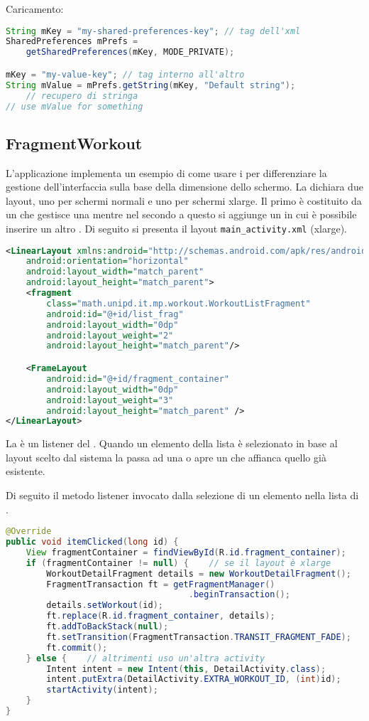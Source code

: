 Caricamento:
\begin{lstlisting}[language=Java]
String mKey = "my-shared-preferences-key"; // tag dell'xml
SharedPreferences mPrefs = 
	getSharedPreferences(mKey, MODE_PRIVATE);

mKey = "my-value-key"; // tag interno all'altro
String mValue = mPrefs.getString(mKey, "Default string"); 
	// recupero di stringa
// use mValue for something
\end{lstlisting}


\subsection{FragmentWorkout}
L'applicazione implementa un esempio di come usare i \Fragment per differenziare la gestione dell'interfaccia sulla base della dimensione dello schermo.
La \MainActivity dichiara due layout, uno per schermi normali e uno per schermi xlarge. Il primo è costituito da un \ListFragment che gestisce una \ListView mentre nel secondo a questo si aggiunge un \FrameLayout in cui è possibile inserire un altro \Fragment. Di seguito si presenta il layout \texttt{main\_activity.xml} (xlarge).

\begin{lstlisting}[language=XML]
<LinearLayout xmlns:android="http://schemas.android.com/apk/res/android"
    android:orientation="horizontal"
    android:layout_width="match_parent"
    android:layout_height="match_parent">
    <fragment
        class="math.unipd.it.mp.workout.WorkoutListFragment"
        android:id="@+id/list_frag"
        android:layout_width="0dp"
        android:layout_weight="2"
        android:layout_height="match_parent"/>

    <FrameLayout
        android:id="@+id/fragment_container"
        android:layout_width="0dp"
        android:layout_weight="3"
        android:layout_height="match_parent" />
</LinearLayout>
\end{lstlisting}

La \MainActivity è un listener del \Fragment \WorkoutListFragment. Quando un elemento della lista è selezionato in base al layout scelto dal sistema la \MainActivity passa ad una \Activity o apre un \Fragment che affianca quello già esistente.

Di seguito il metodo listener invocato dalla selezione di un elemento nella lista di \WorkoutListFragment.

\begin{lstlisting}[language=Java]
@Override
public void itemClicked(long id) {
	View fragmentContainer = findViewById(R.id.fragment_container);
	if (fragmentContainer != null) {	// se il layout è xlarge
		WorkoutDetailFragment details = new WorkoutDetailFragment();
		FragmentTransaction ft = getFragmentManager()
									.beginTransaction();
		details.setWorkout(id);
		ft.replace(R.id.fragment_container, details);
		ft.addToBackStack(null);
		ft.setTransition(FragmentTransaction.TRANSIT_FRAGMENT_FADE);
		ft.commit();
	} else {	// altrimenti uso un'altra activity
		Intent intent = new Intent(this, DetailActivity.class);
		intent.putExtra(DetailActivity.EXTRA_WORKOUT_ID, (int)id);
		startActivity(intent);
	}
}
\end{lstlisting}

